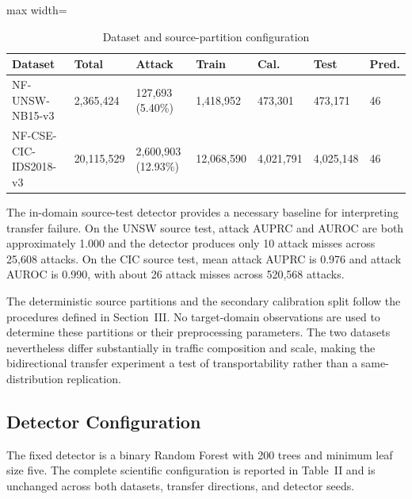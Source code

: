 \documentclass[conference]{IEEEtran}
\begin{document}
\begin{table}[t]
\centering
\caption{Dataset and source-partition configuration}
\begin{adjustbox}{max width=\columnwidth}
\begin{tabular}{lllllll}
\toprule
\textbf{Dataset} & \textbf{Total} & \textbf{Attack} & \textbf{Train} & \textbf{Cal.} & \textbf{Test} & \textbf{Pred.} \\
\midrule
NF-UNSW-NB15-v3 & 2,365,424 & 127,693 (5.40\%) & 1,418,952 & 473,301 & 473,171 & 46 \\
NF-CSE-CIC-IDS2018-v3 & 20,115,529 & 2,600,903 (12.93\%) & 12,068,590 & 4,021,791 & 4,025,148 & 46 \\
\bottomrule
\end{tabular}
\end{adjustbox}
\end{table}

The in-domain source-test detector provides a necessary baseline for interpreting transfer failure. On the UNSW source test, attack AUPRC and AUROC are both approximately 1.000 and the detector produces only 10 attack misses across 25,608 attacks. On the CIC source test, mean attack AUPRC is 0.976 and attack AUROC is 0.990, with about 26 attack misses across 520,568 attacks.

The deterministic source partitions and the secondary calibration split follow the procedures defined in Section~III. No target-domain observations are used to determine these partitions or their preprocessing parameters. The two datasets nevertheless differ substantially in traffic composition and scale, making the bidirectional transfer experiment a test of transportability rather than a same-distribution replication.

\subsection{Detector Configuration}

The fixed detector is a binary Random Forest with 200 trees and minimum leaf size five. The complete scientific configuration is reported in Table~II and is unchanged across both datasets, transfer directions, and detector seeds.
\end{document}
